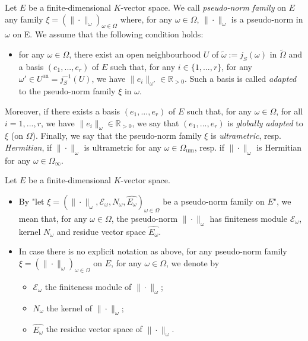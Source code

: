 \documentclass [11pt,reqno]{amsart}
\def\bR{{\mathbb{R}}}
\newcommand{\1}{\mathmybb{1}}
\def\cE{{\mathcal{E}}}
\def\an{\operatorname{an}}
\def\um{\operatorname{um}}
\def\tilde{\widetilde}
\begin{document}
\begin{definition}
\label{def:semi-norm_family}
Let $E$ be a finite-dimensional $K$-vector space. We call \emph{pseudo-norm family} on $E$ any family $\xi =(\|\cdot\|_{\omega})_{\omega\in \Omega}$ where, for any $\omega\in \Omega$, $\|\cdot\|_\omega$ is a pseudo-norm in $\omega$ on E. We assume that the following condition holds: 
\begin{itemize}
	\item[($\ast$)] for any $\omega\in \Omega$, there exist an open neighbourhood $U$ of $\tilde{\omega}:=j_{S}(\omega)$ in $\tilde{\Omega}$ and a basis $(e_{1},...,e_{r})$ of $E$ such that, for any $i\in\{1,...,r\}$, for any $\omega'\in U^{\an}=j_{S}^{-1}(U)$, we have $\|e_i\|_{\omega'} \in \bR_{>0}$. Such a basis is called \emph{adapted} to the pseudo-norm family $\xi$ in $\omega$.
\end{itemize}
Moreover, if there exists a basis $(e_{1},...,e_{r})$ of $E$ such that, for any $\omega\in\Omega$, for all $i=1,...,r$, we have $\|e_i\|_{\omega}\in \bR_{>0}$, we say that $(e_{1},...,e_{r})$ is \emph{globally adapted} to $\xi$ (on $\Omega$).
Finally, we say that the pseudo-norm family $\xi$ is \emph{ultrametric}, resp. \emph{Hermitian}, if $\|\cdot\|_{\omega}$ is ultrametric for any $\omega\in \Omega_{\um}$, resp. if $\|\cdot\|_{\omega}$ is Hermitian for any $\omega\in\Omega_{\infty}$.
\end{definition}

\begin{notation}
\label{notation:pseudo-norm family}
Let $E$ be a finite-dimensional $K$-vector space.
\begin{itemize}
	\item[(1)] By "let $\xi=(\|\cdot\|_{\omega},\cE_{\omega},N_{\omega},\widehat{E_{\omega}})_{\omega\in\Omega}$ be a pseudo-norm family on $E$", we mean that, for any $\omega\in\Omega$, the pseudo-norm $\|\cdot\|_{\omega}$ has finiteness module $\cE_{\omega}$, kernel $N_{\omega}$ and residue vector space $\widehat{E_{\omega}}$. 
	\item[(2)] In case there is no explicit notation as above, for any pseudo-norm family $\xi =(\|\cdot\|_{\omega})_{\omega\in \Omega}$ on $E$, for any $\omega\in\Omega$, we denote by
\begin{itemize}
	\item $\cE_{\omega}$ the finiteness module of $\|\cdot\|_{\omega}$;
	\item $N_{\omega}$ the kernel of $\|\cdot\|_{\omega}$;
	\item $\widehat{E_{\omega}}$ the residue vector space of $\|\cdot\|_{\omega}$.
\end{itemize}
\end{itemize}
\end{notation}
\end{document}
